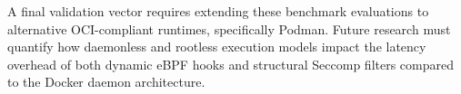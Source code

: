 A final validation vector requires extending these benchmark evaluations to alternative OCI-compliant runtimes, specifically Podman. Future research must quantify how daemonless and rootless execution models impact the latency overhead of both dynamic eBPF hooks and structural Seccomp filters compared to the Docker daemon architecture.
